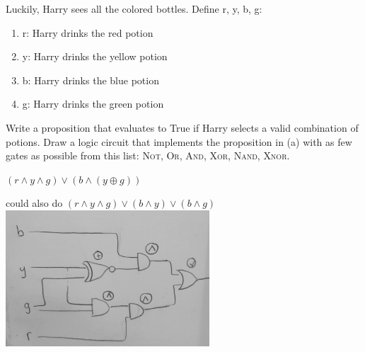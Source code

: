 \documentclass[solution, letterpaper]{cs20exam}
\begin{document}
Luckily, Harry sees all the colored bottles. Define r, y, b, g:
\begin{enumerate}
\item r: Harry drinks the red potion
\item y: Harry drinks the yellow potion
\item b: Harry drinks the blue potion
\item g: Harry drinks the green potion
\end{enumerate}

\subproblem Write a proposition that evaluates to True if Harry selects a valid combination of potions. 
\subproblem Draw a logic circuit that implements the proposition in (a) with as few gates as possible from this list: \textsc{Not}, \textsc{Or}, \textsc{And}, \textsc{Xor}, \textsc{Nand}, \textsc{Xnor}.

\begin{solution}

\subsolution $(r \land y \land g) \lor (b \land (y \oplus g))$

could also do 
$(r \land y \land g) \lor (b \land y) \lor (b \land g)$
\subsolution 
\includegraphics[width=3in]{LogicGate.jpg}

\end{solution}
\end{document}
